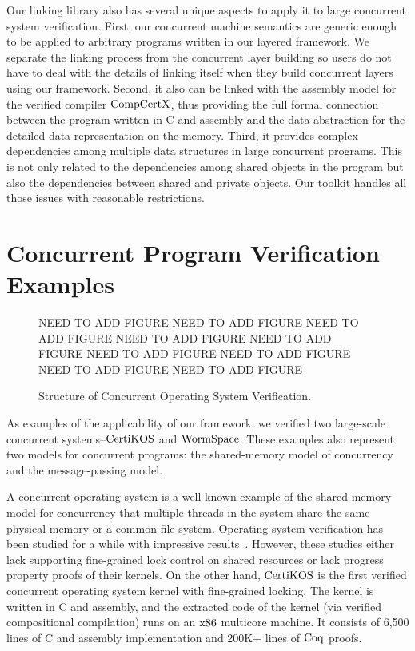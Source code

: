 Our linking library also has several unique aspects to apply it to large concurrent system verification. 
First, our concurrent machine semantics are generic enough to be applied to arbitrary programs written in our layered framework. 
We separate the linking process from the concurrent layer building so users do not have to deal with the details of linking itself when they 
build concurrent layers using our framework. Second, it also can be linked with the assembly model for the verified compiler $\mathrm{CompCertX}$, thus
 providing the full formal connection between the program written in C and assembly and the data abstraction for the detailed data 
 representation on the memory. Third, it provides complex dependencies among multiple data structures in large concurrent programs. 
 This is not only related to the dependencies among shared objects in the program but also the dependencies between 
 shared and private objects. Our toolkit handles all those issues with reasonable restrictions.

\section{Concurrent Program Verification Examples}
\label{chapter:introduction:sec:concurrent-program-verification-examples}


\begin{figure}

NEED TO ADD FIGURE
NEED TO ADD FIGURE
NEED TO ADD FIGURE
NEED TO ADD FIGURE
NEED TO ADD FIGURE
NEED TO ADD FIGURE
NEED TO ADD FIGURE
NEED TO ADD FIGURE
NEED TO ADD FIGURE

\label{fig:intro:certikos-structure}
\caption{Structure of Concurrent Operating System Verification.}
\end{figure}



As examples of the applicability of our framework, we verified two large-scale concurrent systems--$\mathrm{CertiKOS}$ and $\mathrm{WormSpace}$.
These examples also represent two models for concurrent programs: 
the shared-memory model of concurrency and the message-passing model.

A concurrent operating system is a well-known example of the shared-memory model for concurrency that multiple threads 
in the system share the same physical memory or a common 
file system. Operating system verification has been studied for a while with impressive results~\cite{klein2009sel4, xu16, hawblitzel10}.
However, these studies either lack supporting fine-grained lock control on shared resources or lack progress property proofs of their kernels.
 On the other hand, $\mathrm{CertiKOS}$ is the first verified concurrent operating system kernel with fine-grained locking. 
 The kernel is written in C and assembly, and the extracted code of the kernel (via verified compositional compilation) 
 runs on an $\mathrm{x86}$ multicore machine. It consists of 6,500 lines of C and assembly implementation and 200K+ lines of $\mathrm{Coq}$ proofs.

